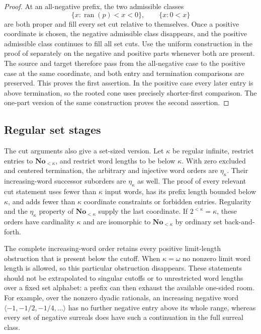 \documentclass[11pt]{article}
\theoremstyle{definition}
\theoremstyle{remark}
\newcommand{\No}{\mathbf{No}}
\begin{document}
\begin{proof}
At an all-negative prefix, the two admissible classes
\[
 \{x:\operatorname{ran}(p)<x<0\},\qquad \{x:0<x\}
\]
are both proper and fill every set cut relative to themselves.
Once a positive coordinate is chosen, the negative admissible
class disappears, and the positive admissible class continues to
fill all set cuts.  Use the uniform construction in the proof of
 separately on the negative and
positive parts whenever both are present.  The source and target
therefore pass from the all-negative case to the positive case
at the same coordinate, and both entry and termination comparisons
are preserved.  This proves the first assertion.  In the positive
case every later entry is above termination, so the rooted cone
uses precisely shorter-first comparison.  The one-part version
of the same construction proves the second assertion.
\end{proof}

\subsection{Regular set stages}
\label{swo:sh:wv:regular-stages}

The cut arguments also give a set-sized version.  Let \(\kappa\)
be regular infinite, restrict entries to \(\No_{<\kappa}\), and
restrict word lengths to be below \(\kappa\).  With zero excluded
and centered termination, the arbitrary and injective word orders
are \(\eta_\kappa\).  Their increasing-word successor suborders
are \(\eta_\kappa\) as well.  The proof of every relevant cut
statement uses fewer than \(\kappa\) input words, has its prefix
length bounded below \(\kappa\), and adds fewer than \(\kappa\)
coordinate constraints or forbidden entries.  Regularity and
the \(\eta_\kappa\) property of \(\No_{<\kappa}\) supply the
last coordinate.  If \(2^{<\kappa}=\kappa\), these orders have
cardinality \(\kappa\) and are isomorphic to \(\No_{<\kappa}\)
by ordinary set back-and-forth.

The complete increasing-word order retains every positive
limit-length obstruction that is present below the cutoff.
When \(\kappa=\omega\) no nonzero limit word length is allowed,
so this particular obstruction disappears.  These statements
should not be extrapolated to singular cutoffs or to unrestricted
word lengths over a fixed set alphabet: a prefix can then exhaust
the available one-sided room.  For example, over the nonzero
dyadic rationals, an increasing negative word
\(\langle-1,-1/2,-1/4,\ldots\rangle\) has no further negative
entry above its whole range, whereas every set of negative
surreals does have such a continuation in the full surreal class.
\end{document}
